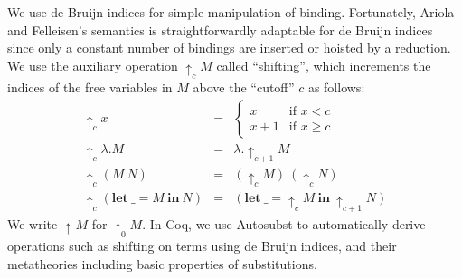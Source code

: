 \documentclass{llncs}
\newcommand{\LET}[3]{\mathbf{let}~#1=#2~\mathbf{in}~#3}
\newcommand{\SHIFT}[2]{{\uparrow_{#1}}#2}
\begin{document}
We use de Bruijn indices for simple manipulation of binding.
Fortunately, Ariola and Felleisen's semantics is straightforwardly adaptable for de Bruijn indices
since only a constant number of bindings are inserted or hoisted by a reduction.
We use the auxiliary operation $\SHIFT{c}{M}$ called ``shifting'',
which increments the indices of the free variables in $M$ above the ``cutoff'' $c$ as follows:
\[\begin{array}{rcl}
	\SHIFT{c}{x} & = &
		\begin{cases}
			x & \text{if $x < c$} \\
			x + 1 & \text{if $x \geq c$}
		\end{cases} \\
	\SHIFT{c}{\lambda.M} & = & \lambda. \SHIFT{c + 1}{M} \\
	\SHIFT{c}{(M~N)} & = & (\SHIFT{c}{M})~(\SHIFT{c}{N}) \\
	\SHIFT{c}{(\LET{\_}{M}{N})} & = & (\LET{\_}{\SHIFT{c}{M}}{\SHIFT{c+1}{N}})
\end{array} \]
We write $\SHIFT{{}}{M}$ for $\SHIFT{0}{M}$.
In Coq, we use Autosubst \cite{Schaefer15} to automatically derive operations such as shifting on terms using de Bruijn indices, and their metatheories including basic properties of substitutions.
\end{document}
